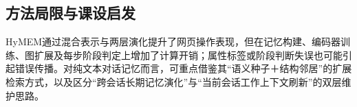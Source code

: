 \subsection{方法局限与课设启发}

HyMEM通过混合表示与两层演化提升了网页操作表现，但在记忆构建、编码器训练、图扩展及每步阶段判定上增加了计算开销；属性标签或阶段判断失误也可能引起错误传播。对纯文本对话记忆而言，可重点借鉴其“语义种子＋结构邻居”的扩展检索方式，以及区分“跨会话长期记忆演化”与“当前会话工作上下文刷新”的双层维护思路。

